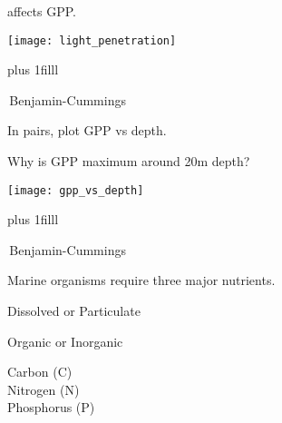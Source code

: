 \documentclass[t]{beamer}
\begin{document}
\begin{frame}[t]{ affects GPP.}
\vspace*{-\baselineskip}
\begin{center}
	\texttt{[image: light\_penetration]}
\end{center}

\vskip0pt plus 1filll

\tiny\textcopyright\,Benjamin-Cummings
\end{frame}



\begin{frame}[t]{In pairs, plot GPP vs depth.}
\end{frame}

\begin{frame}[t]{Why is GPP maximum around 20m depth?}
	\vspace*{-\baselineskip}
	\begin{center}
		\texttt{[image: gpp\_vs\_depth]}
	\end{center}

	\vskip0pt plus 1filll

	\tiny\textcopyright\,Benjamin-Cummings
\end{frame}


\begin{frame}[t]{Marine organisms require three major nutrients.}

	\begin{multicols}{2}

		\begin{center}
			
			\vspace*{4\baselineskip}
			
		\end{center}
				
	\columnbreak
	
		\hangpara Dissolved or Particulate
		
		\hangpara Organic or Inorganic
		
		\hangpara Carbon (C)\\ Nitrogen (N)\\ Phosphorus (P)
		
	\end{multicols}
\end{frame}
\end{document}
